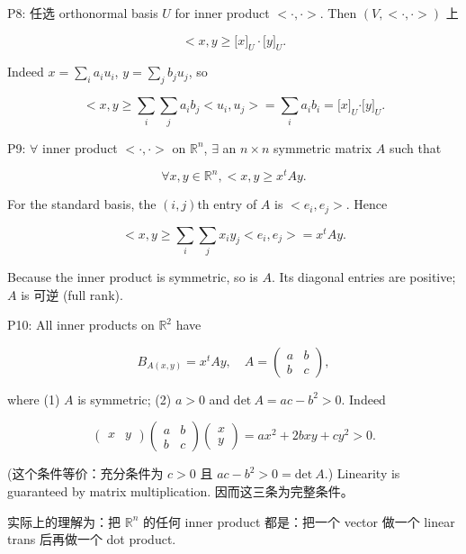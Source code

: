 P8: 任选 orthonormal basis \(U\) for inner product \(< \cdot , \cdot >\). Then \(\left( {V, < \cdot , \cdot >} \right)\) 上

\[< x,y \geq \lbrack x\rbrack_{U} \cdot \lbrack y\rbrack_{U}.\]

Indeed \(x = \sum_{i}a_{i}u_{i}\), \(y = \sum_{j}b_{j}u_{j}\), so

\[< x,y \geq \sum\limits_{i}\sum\limits_{j}a_{i}b_{j} < u_{i},u_{j} > = \sum\limits_{i}a_{i}b_{i} = \lbrack x\rbrack_{U}{\cdot \lbrack y\rbrack}_{U}.\]

P9: \(\forall\) inner product \(< \cdot , \cdot >\) on \(\mathbb{R}^{n}\), \(\exists\) an \(n \times n\) symmetric matrix \(A\) such that

\[\forall x,y \in \mathbb{R}^{n}, < x,y \geq x^{t}Ay.\]

For the standard basis, the \(\left( {i,j} \right)\)th entry of \(A\) is \(< e_{i},e_{j} >\). Hence

\[< x,y \geq \sum\limits_{i}\sum\limits_{j}x_{i}y_{j} < e_{i},e_{j} > = x^{t}Ay.\]

Because the inner product is symmetric, so is \(A\). Its diagonal entries are positive; \(A\) is 可逆 (full rank).

P10: All inner products on \(\mathbb{R}^{2}\) have

\[B_{A{({x,y})}} = x^{t}Ay,\quad A = \begin{pmatrix}
a & b \\
b & c
\end{pmatrix},\]

where (1) \(A\) is symmetric; (2) \(a > 0\) and \(\text{det}\ A = ac - b^{2} > 0\). Indeed

\[\begin{pmatrix}
x & y
\end{pmatrix}\begin{pmatrix}
a & b \\
b & c
\end{pmatrix}\begin{pmatrix}
x \\
y
\end{pmatrix} = ax^{2} + 2bxy + cy^{2} > 0.\]

(这个条件等价：充分条件为 \(c > 0\) 且 \(ac - b^{2} > 0 = \text{det}\ A\).) Linearity is guaranteed by matrix multiplication. 因而这三条为完整条件。

实际上的理解为：把 \(\mathbb{R}^{n}\) 的任何 inner product 都是：把一个 vector 做一个 linear trans 后再做一个 dot product.
